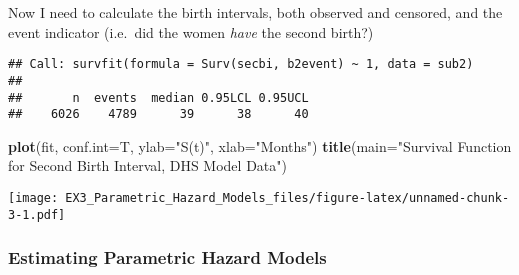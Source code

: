 \documentclass[
]{article}
\newenvironment{Shaded}{\begin{snugshade}}{\end{snugshade}}
\newcommand{\DataTypeTok}[1]{\textcolor[rgb]{0.13,0.29,0.53}{#1}}
\newcommand{\DecValTok}[1]{\textcolor[rgb]{0.00,0.00,0.81}{#1}}
\newcommand{\KeywordTok}[1]{\textcolor[rgb]{0.13,0.29,0.53}{\textbf{#1}}}
\newcommand{\NormalTok}[1]{#1}
\newcommand{\OperatorTok}[1]{\textcolor[rgb]{0.81,0.36,0.00}{\textbf{#1}}}
\newcommand{\StringTok}[1]{\textcolor[rgb]{0.31,0.60,0.02}{#1}}
\begin{document}
Now I need to calculate the birth intervals, both observed and censored,
and the event indicator (i.e.~did the women \emph{have} the second
birth?)

\begin{Shaded}
\end{Shaded}

\begin{verbatim}
## Call: survfit(formula = Surv(secbi, b2event) ~ 1, data = sub2)
## 
##       n  events  median 0.95LCL 0.95UCL 
##    6026    4789      39      38      40
\end{verbatim}

\begin{Shaded}
\begin{Highlighting}[]
\KeywordTok{plot}\NormalTok{(fit, }\DataTypeTok{conf.int=}\NormalTok{T, }\DataTypeTok{ylab=}\StringTok{"S(t)"}\NormalTok{, }\DataTypeTok{xlab=}\StringTok{"Months"}\NormalTok{)}
\KeywordTok{title}\NormalTok{(}\DataTypeTok{main=}\StringTok{"Survival Function for Second Birth Interval, DHS Model Data"}\NormalTok{)}
\end{Highlighting}
\end{Shaded}

\texttt{[image: EX3\_Parametric\_Hazard\_Models\_files/figure-latex/unnamed-chunk-3-1.pdf]}

\hypertarget{estimating-parametric-hazard-models}{%
\subsubsection{Estimating Parametric Hazard
Models}\label{estimating-parametric-hazard-models}}
\end{document}
